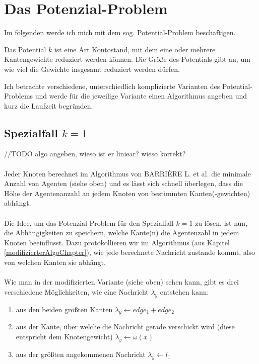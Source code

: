 \section{Das Potenzial-Problem}

Im folgenden werde ich mich mit dem sog. Potential-Problem beschäftigen.

\begin{mydef}
	Das Potential $k$ ist eine Art Kontostand, mit dem eine oder mehrere Kantengewichte reduziert werden können. Die Größe des Potentials gibt an, um wie viel die Gewichte insgesamt reduziert werden dürfen.
\end{mydef}

Ich betrachte verschiedene, unterschiedlich komplizierte Varianten des Potential-Problems und werde für die jeweilige Variante einen Algorithmus angeben und kurz die Laufzeit begründen.

\subsection{Spezialfall $k = 1$}
//TODO algo angeben, wieso ist er liniear? wieso korrekt?
\\
\\
Jeder Knoten berechnet im Algorithmus von BARRIÈRE L. et al. die minimale Anzahl von Agenten (siehe oben) und es lässt sich schnell überlegen, dass die Höhe der Agentenanzahl an jedem Knoten von bestimmten Kanten(-gewichten) abhängt.
\\
\\
Die Idee, um das Potenzial-Problem für den Spezialfall $k = 1$ zu lösen, ist nun, die Abhängigkeiten zu speichern, welche Kante(n) die Agentenzahl in jedem Knoten beeinflusst. Dazu protokollieren wir im Algorithmus (aus Kapitel \ref{modifizierterAlgoChapter}), wie jede berechnete Nachricht zustande kommt, also von welchen Kanten sie abhängt.
\\
\\ 
Wie man in der modifizierten Variante (siehe oben) sehen kann, gibt es drei verschiedene Möglichkeiten, wie eine Nachricht 	$\lambda_{y}$ entstehen kann:

\begin{enumerate}[label=\alph*)]
	
	\item aus den beiden größten Kanten $\lambda_{y} \gets edge_{1} + edge_{2}$ \label{entstehung_nachricht_max1+max2}
	
	\item aus der Kante, über welche die Nachricht gerade verschickt wird (diese entspricht dem Knotengewicht) $\lambda_{y} \gets \omega(x)$
	
	\item aus der größten angekommenen Nachricht $\lambda_{y} \gets l_{1}$

\end{enumerate}

